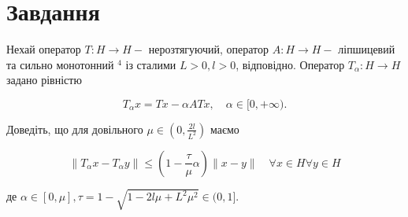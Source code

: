 
\chapter{Завдання \theHchapter}

\begin{tcolorbox}[title=Завдання]
    Нехай оператор $T: H \rightarrow H-$ нерозтягуючий, оператор $A: H \rightarrow H-$ ліпшицевий та сильно монотонний $^{4}$ із сталими $L>0, l>0$, відповідно. Оператор $T_{\alpha}: H \rightarrow H$ задано рівністю

    $$
    T_{\alpha} x=T x-\alpha A T x, \quad \alpha \in[0,+\infty) .
    $$

    Доведіть, що для довільного $\mu \in\left(0, \frac{2 l}{L^{2}}\right)$ маємо

    $$
    \left\|T_{\alpha} x-T_{\alpha} y\right\| \leq\left(1-\frac{\tau}{\mu} \alpha\right)\|x-y\| \quad \forall x \in H \forall y \in H
    $$
    \vspace{0.3cm}

    де $\alpha \in[0, \mu], \tau=1-\sqrt{1-2 l \mu+L^{2} \mu^{2}} \in(0,1]$.
\end{tcolorbox}

